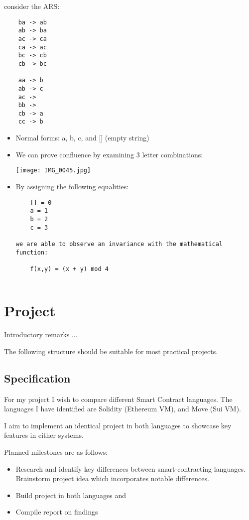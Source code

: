 \documentclass{article}
\theoremstyle{theorem}
\theoremstyle{definition}
\theoremstyle{remark}
\begin{document}
consider the ARS:
\begin{verbatim}
    ba -> ab
    ab -> ba
    ac -> ca
    ca -> ac
    bc -> cb
    cb -> bc
 
    aa -> b
    ab -> c
    ac ->  
    bb ->
    cb -> a
    cc -> b
\end{verbatim}  
\begin{itemize}
\item Normal forms: a, b, c, and [] (empty string)

\item We can prove confluence by examining 3 letter combinations:

\texttt{[image: IMG\_0045.jpg]}

\item By assigning the following equalities:
\begin{verbatim}
    [] = 0
    a = 1
    b = 2
    c = 3

we are able to observe an invariance with the mathematical function:
    
    f(x,y) = (x + y) mod 4
    
\end{verbatim}

\end{itemize}


\section{Project}

Introductory remarks ...

The following structure should be suitable for most practical projects. 

\subsection{Specification}

For my project I wish to compare different Smart Contract languages. The languages I have identified are Solidity (Ethereum VM), and Move (Sui VM).

I aim to implement an identical project in both languages to showcase key features in either systems.

Planned milestones are as follows:
\begin{itemize}
    \item Research and identify key differences between smart-contracting languages. Brainstorm project idea which incorporates notable differences.
    \item Build project in both languages and 
    \item Compile report on findings
\end{itemize}
    
\end{document}
